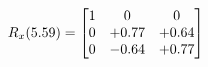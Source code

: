 \documentclass[preview]{standalone}
\begin{document}
\begin{align*}
\special{dvisvgm:raw <g id='unique000'>}R_{x}(5.59) = \begin{bmatrix}1 & 0 & 0 \\0 & +0.77 & +0.64 \\0 & -0.64 & +0.77\end{bmatrix}\special{dvisvgm:raw </g>}
\end{align*}
\end{document}
